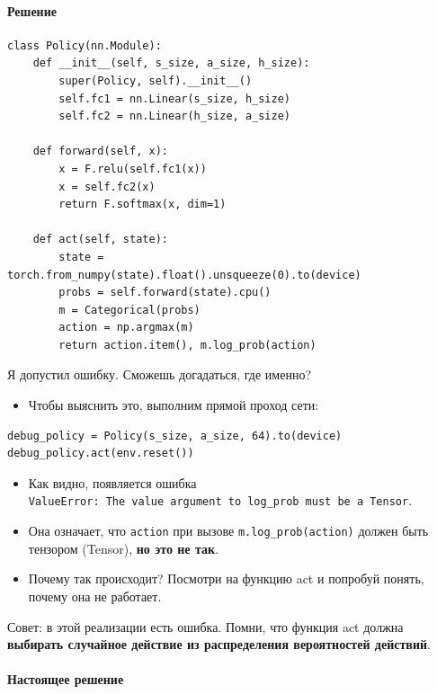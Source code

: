 \documentclass[11pt,a4paper]{article}
\begin{document}
\paragraph{Решение}\label{solution}

\begin{lstlisting}
class Policy(nn.Module):
    def __init__(self, s_size, a_size, h_size):
        super(Policy, self).__init__()
        self.fc1 = nn.Linear(s_size, h_size)
        self.fc2 = nn.Linear(h_size, a_size)

    def forward(self, x):
        x = F.relu(self.fc1(x))
        x = self.fc2(x)
        return F.softmax(x, dim=1)

    def act(self, state):
        state = torch.from_numpy(state).float().unsqueeze(0).to(device)
        probs = self.forward(state).cpu()
        m = Categorical(probs)
        action = np.argmax(m)
        return action.item(), m.log_prob(action)
\end{lstlisting}

Я допустил ошибку. Сможешь догадаться, где именно?

\begin{itemize}
\tightlist
\item
  Чтобы выяснить это, выполним прямой проход сети:
\end{itemize}

\begin{lstlisting}
debug_policy = Policy(s_size, a_size, 64).to(device)
debug_policy.act(env.reset())
\end{lstlisting}

\begin{itemize}
\item
  Как видно, появляется ошибка \texttt{ValueError:\ The\ value\ argument\ to\ log\_prob\ must\ be\ a\ Tensor}.
\item
  Она означает, что \texttt{action} при вызове \texttt{m.log\_prob(action)} должен быть тензором (Tensor), \textbf{но это не так}.
\item
  Почему так происходит? Посмотри на функцию act и попробуй понять, почему она не работает.
\end{itemize}

Совет: в этой реализации есть ошибка. Помни, что функция act должна \textbf{выбирать случайное действие из распределения вероятностей действий}.

\paragraph{Настоящее решение}\label{real-solution}
\end{document}
